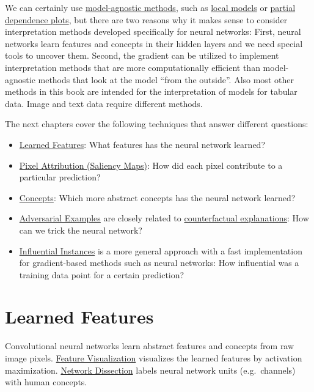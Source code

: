 \documentclass[
  12pt,
]{krantz}
\providecommand{\tightlist}{%
  \setlength{\itemsep}{0pt}\setlength{\parskip}{0pt}}
\begin{document}
We can certainly use \protect\hyperlink{agnostic}{model-agnostic methods}, such as \protect\hyperlink{lime}{local models} or \protect\hyperlink{pdp}{partial dependence plots}, but there are two reasons why it makes sense to consider interpretation methods developed specifically for neural networks:
First, neural networks learn features and concepts in their hidden layers and we need special tools to uncover them.
Second, the gradient can be utilized to implement interpretation methods that are more computationally efficient than model-agnostic methods that look at the model ``from the outside''.
Also most other methods in this book are intended for the interpretation of models for tabular data.
Image and text data require different methods.

The next chapters cover the following techniques that answer different questions:

\begin{itemize}
\tightlist
\item
  \protect\hyperlink{feature-visualization}{Learned Features}: What features has the neural network learned?
\item
  \protect\hyperlink{pixel-attribution}{Pixel Attribution (Saliency Maps)}: How did each pixel contribute to a particular prediction?
\item
  \protect\hyperlink{neural-concepts}{Concepts}: Which more abstract concepts has the neural network learned?
\item
  \protect\hyperlink{adversarial}{Adversarial Examples} are closely related to \protect\hyperlink{counterfactual}{counterfactual explanations}: How can we trick the neural network?
\item
  \protect\hyperlink{influential}{Influential Instances} is a more general approach with a fast implementation for gradient-based methods such as neural networks: How influential was a training data point for a certain prediction?
\end{itemize}

\newpage

\hypertarget{cnn-features}{%
\section{Learned Features}\label{cnn-features}}

Convolutional neural networks learn abstract features and concepts from raw image pixels.
\protect\hyperlink{feature-visualization}{Feature Visualization} visualizes the learned features by activation maximization.
\protect\hyperlink{network-dissection}{Network Dissection} labels neural network units (e.g.~channels) with human concepts.
\end{document}
